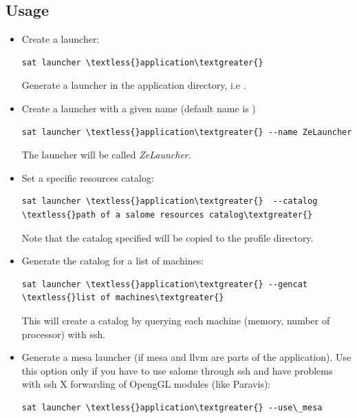 \documentclass[a4paper,10pt,english]{sphinxmanual}
\begin{document}
\subsection{Usage}
\label{commands/launcher:usage}\begin{itemize}
\item {} 
Create a launcher:

\begin{Verbatim}[commandchars=\\\{\}]
sat launcher \textless{}application\textgreater{}
\end{Verbatim}

Generate a launcher in the application directory, i.e .

\item {} 
Create a launcher with a given name (default name is )

\begin{Verbatim}[commandchars=\\\{\}]
sat launcher \textless{}application\textgreater{} --name ZeLauncher
\end{Verbatim}

The launcher will be called \emph{ZeLauncher}.

\item {} 
Set a specific resources catalog:

\begin{Verbatim}[commandchars=\\\{\}]
sat launcher \textless{}application\textgreater{}  --catalog  \textless{}path of a salome resources catalog\textgreater{}
\end{Verbatim}

Note that the catalog specified will be copied to the profile directory.

\item {} 
Generate the catalog for a list of machines:

\begin{Verbatim}[commandchars=\\\{\}]
sat launcher \textless{}application\textgreater{} --gencat \textless{}list of machines\textgreater{}
\end{Verbatim}

This will create a catalog by querying each machine (memory, number of processor) with ssh.

\item {} 
Generate a mesa launcher (if mesa and llvm are parts of the application). Use this option only if you have to use salome through ssh and have problems with ssh X forwarding of OpengGL modules (like Paravis):

\begin{Verbatim}[commandchars=\\\{\}]
sat launcher \textless{}application\textgreater{} --use\_mesa
\end{Verbatim}

\end{itemize}
\end{document}

